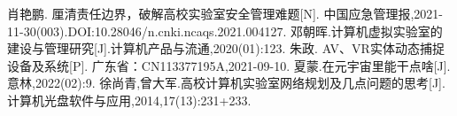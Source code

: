 \documentclass{imutthesis}
\begin{document}
\begin{thebibliography}{1}%

肖艳鹏. 厘清责任边界，破解高校实验室安全管理难题[N]. 中国应急管理报,2021-11-30(003).DOI:10.28046/n.cnki.ncaqs.2021.004127.
邓朝晖.计算机虚拟实验室的建设与管理研究[J].计算机产品与流通,2020(01):123.
朱政. AV、VR实体动态捕捉设备及系统[P]. 广东省：CN113377195A,2021-09-10.
夏蒙.在元宇宙里能干点啥[J].意林,2022(02):9.
徐尚青,曾大军.高校计算机实验室网络规划及几点问题的思考[J].计算机光盘软件与应用,2014,17(13):231+233.
\end{thebibliography}
\end{document}
